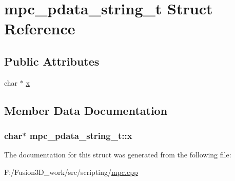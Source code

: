 \hypertarget{structmpc__pdata__string__t}{}\section{mpc\+\_\+pdata\+\_\+string\+\_\+t Struct Reference}
\label{structmpc__pdata__string__t}
\subsection*{Public Attributes}
\begin{DoxyCompactItemize}
\item 
char $\ast$ \hyperlink{structmpc__pdata__string__t_a40955c1fed7a4485def523eb530adcca}{x}
\end{DoxyCompactItemize}


\subsection{Member Data Documentation}
\hypertarget{structmpc__pdata__string__t_a40955c1fed7a4485def523eb530adcca}{}
\subsubsection[{x}]{\setlength{\rightskip}{0pt plus 5cm}char$\ast$ mpc\+\_\+pdata\+\_\+string\+\_\+t\+::x}\label{structmpc__pdata__string__t_a40955c1fed7a4485def523eb530adcca}


The documentation for this struct was generated from the following file\+:\begin{DoxyCompactItemize}
\item 
F\+:/\+Fusion3\+D\+\_\+work/src/scripting/\hyperlink{mpc_8cpp}{mpc.\+cpp}\end{DoxyCompactItemize}
